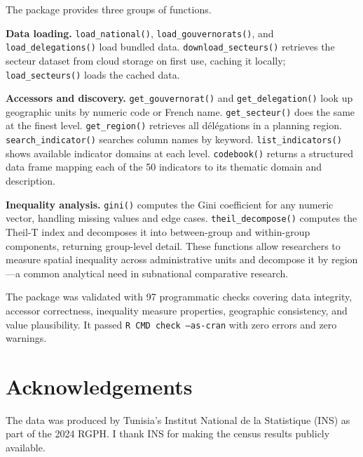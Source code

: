 \documentclass[12pt]{article}
\begin{document}
The package provides three groups of functions.

\textbf{Data loading.} \texttt{load\_national()}, \texttt{load\_gouvernorats()}, and \texttt{load\_delegations()} load bundled data. \texttt{download\_secteurs()} retrieves the secteur dataset from cloud storage on first use, caching it locally; \texttt{load\_secteurs()} loads the cached data.

\textbf{Accessors and discovery.} \texttt{get\_gouvernorat()} and \texttt{get\_delegation()} look up geographic units by numeric code or French name. \texttt{get\_secteur()} does the same at the finest level. \texttt{get\_region()} retrieves all d\'{e}l\'{e}gations in a planning region. \texttt{search\_indicator()} searches column names by keyword. \texttt{list\_indicators()} shows available indicator domains at each level. \texttt{codebook()} returns a structured data frame mapping each of the 50 indicators to its thematic domain and description.

\textbf{Inequality analysis.} \texttt{gini()} computes the Gini coefficient for any numeric vector, handling missing values and edge cases. \texttt{theil\_decompose()} computes the Theil-T index and decomposes it into between-group and within-group components, returning group-level detail. These functions allow researchers to measure spatial inequality across administrative units and decompose it by region---a common analytical need in subnational comparative research.

The package was validated with 97 programmatic checks covering data integrity, accessor correctness, inequality measure properties, geographic consistency, and value plausibility. It passed \texttt{R CMD check --as-cran} with zero errors and zero warnings.


\section*{Acknowledgements}

The data was produced by Tunisia's Institut National de la Statistique (INS) as part of the 2024 RGPH. I thank INS for making the census results publicly available.


\end{document}
